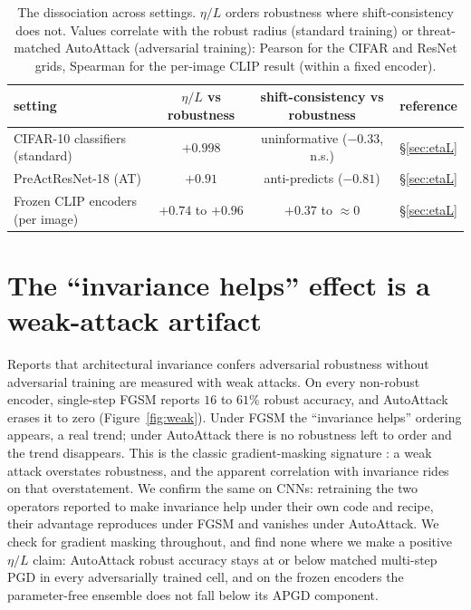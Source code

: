 \documentclass{article}
\theoremstyle{definition}
\newcommand{\etaL}{\eta/L}
\begin{document}
\begin{table}[t]\centering\small
  \caption{The dissociation across settings. $\etaL$ orders robustness where shift-consistency does not.
  Values correlate with the robust radius (standard training) or threat-matched AutoAttack (adversarial
  training): Pearson for the CIFAR and ResNet grids, Spearman for the per-image CLIP result (within a
  fixed encoder).}
  \label{tab:dissoc}
  \begin{tabular}{lccc}
    \toprule
    setting & $\etaL$ vs robustness & shift-consistency vs robustness & reference \\
    \midrule
    CIFAR-10 classifiers (standard)   & $+0.998$ & uninformative ($-0.33$, n.s.) & \S\ref{sec:etaL} \\
    PreActResNet-18 (AT)              & $+0.91$ & anti-predicts ($-0.81$) & \S\ref{sec:etaL} \\
    Frozen CLIP encoders (per image)   & $+0.74$ to $+0.96$ & $+0.37$ to $\approx 0$ & \S\ref{sec:etaL} \\
    \bottomrule
  \end{tabular}
\end{table}

\section{The ``invariance helps'' effect is a weak-attack artifact}\label{sec:weak}
Reports that architectural invariance confers adversarial robustness without adversarial training are
measured with weak attacks. On every non-robust encoder, single-step FGSM reports $16$ to $61\%$ robust
accuracy, and AutoAttack erases it to zero (Figure~\ref{fig:weak}). Under FGSM the ``invariance helps''
ordering appears, a real trend; under AutoAttack there is no robustness left to order and the trend
disappears. This is the classic gradient-masking signature \citep{athalye}: a weak attack
overstates robustness, and the apparent correlation with invariance rides on that overstatement. We
confirm the same on CNNs: retraining the two operators reported to make invariance help
\citep{saha2024improving,wang2025bridging} under their own code and recipe, their advantage reproduces
under FGSM and vanishes under AutoAttack. We check for gradient masking throughout, and find none where
we make a positive $\etaL$ claim: AutoAttack robust accuracy stays at or below matched multi-step PGD in
every adversarially trained cell, and on the frozen encoders the parameter-free ensemble does not fall
below its APGD component.
\end{document}
